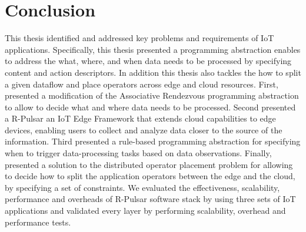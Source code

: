 \section{Conclusion}
This thesis identified and addressed key problems and requirements of IoT applications. Specifically, this thesis presented a programming abstraction enables to address the what, where, and when data needs to be processed by specifying content and action descriptors. In addition this thesis also tackles the how to split a given dataflow and place operators across edge and cloud resources. First, presented a modification of the Associative Rendezvous programming abstraction to allow to decide what and where data needs to be processed. Second presented a R-Pulsar an IoT Edge Framework that extends cloud capabilities to edge devices, enabling users to collect and analyze data closer to the source of the information. Third presented a rule-based programming abstraction for specifying when to trigger data-processing tasks based on data observations. Finally, presented a solution to the distributed operator placement problem for allowing to decide how to split the application operators between the edge and the cloud, by specifying a set of constraints. We evaluated the effectiveness, scalability, performance and overheads of R-Pulsar software stack by using three sets of IoT applications and validated every layer by performing scalability, overhead and performance tests.

